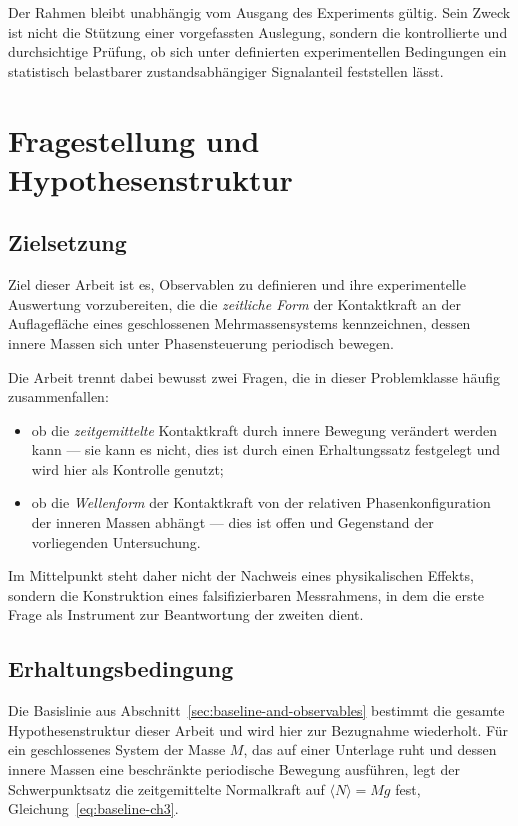 \documentclass[12pt,a4paper]{report}
\begin{document}
Der Rahmen bleibt unabhängig vom Ausgang des Experiments gültig. Sein
Zweck ist nicht die Stützung einer vorgefassten Auslegung, sondern die
kontrollierte und durchsichtige Prüfung, ob sich unter definierten
experimentellen Bedingungen ein statistisch belastbarer
zustandsabhängiger Signalanteil feststellen lässt.


\chapter{Fragestellung und Hypothesenstruktur}
\label{chap:frage}

\section{Zielsetzung}

Ziel dieser Arbeit ist es, Observablen zu definieren und ihre
experimentelle Auswertung vorzubereiten, die die \emph{zeitliche Form}
der Kontaktkraft an der Auflagefläche eines geschlossenen
Mehrmassensystems kennzeichnen, dessen innere Massen sich unter
Phasensteuerung periodisch bewegen.

Die Arbeit trennt dabei bewusst zwei Fragen, die in dieser Problemklasse
häufig zusammenfallen:

\begin{itemize}
  \item ob die \emph{zeitgemittelte} Kontaktkraft durch innere Bewegung
        verändert werden kann --- sie kann es nicht, dies ist durch einen
        Erhaltungssatz festgelegt und wird hier als Kontrolle genutzt;
  \item ob die \emph{Wellenform} der Kontaktkraft von der relativen
        Phasenkonfiguration der inneren Massen abhängt --- dies ist offen
        und Gegenstand der vorliegenden Untersuchung.
\end{itemize}

Im Mittelpunkt steht daher nicht der Nachweis eines physikalischen
Effekts, sondern die Konstruktion eines falsifizierbaren Messrahmens, in
dem die erste Frage als Instrument zur Beantwortung der zweiten dient.

\section{Erhaltungsbedingung}
\label{sec:conservation-constraint}

Die Basislinie aus Abschnitt~\ref{sec:baseline-and-observables} bestimmt
die gesamte Hypothesenstruktur dieser Arbeit und wird hier zur
Bezugnahme wiederholt. Für ein geschlossenes System der Masse $M$, das
auf einer Unterlage ruht und dessen innere Massen eine beschränkte
periodische Bewegung ausführen, legt der Schwerpunktsatz die
zeitgemittelte Normalkraft auf $\langle N \rangle = Mg$ fest,
Gleichung~\eqref{eq:baseline-ch3}.
\end{document}
